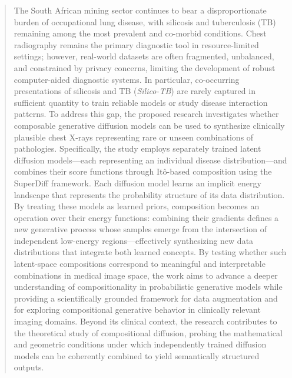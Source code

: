 \begin{abstract}
The South African mining sector continues to bear a disproportionate burden of occupational lung disease, with silicosis and tuberculosis (TB) remaining among the most prevalent and co-morbid conditions. 
Chest radiography remains the primary diagnostic tool in resource-limited settings; however, real-world datasets are often fragmented, unbalanced, and constrained by privacy concerns, limiting the development of robust computer-aided diagnostic systems. 
In particular, co-occurring presentations of silicosis and TB (\emph{Silico-TB}) are rarely captured in sufficient quantity to train reliable models or study disease interaction patterns. 
To address this gap, the proposed research investigates whether composable generative diffusion models can be used to synthesize clinically plausible chest X-rays representing rare or unseen combinations of pathologies. 
Specifically, the study employs separately trained latent diffusion models—each representing an individual disease distribution—and combines their score functions through Itô-based composition using the SuperDiff framework. 
Each diffusion model learns an implicit energy landscape that represents the probability structure of its data distribution.
By treating these models as learned priors, composition becomes an operation over their energy functions:
combining their gradients defines a new generative process whose samples emerge from the intersection of independent low-energy regions—effectively synthesizing new data distributions that integrate both learned concepts.
By testing whether such latent-space compositions correspond to meaningful and interpretable combinations in medical image space, the work aims to advance a deeper understanding of compositionality in probabilistic generative models while providing a scientifically grounded framework for data augmentation and for exploring compositional generative behavior in clinically relevant imaging domains.
Beyond its clinical context, the research contributes to the theoretical study of compositional diffusion, probing the mathematical and geometric conditions under which independently trained diffusion models can be coherently combined to yield semantically structured outputs.
\end{abstract}
